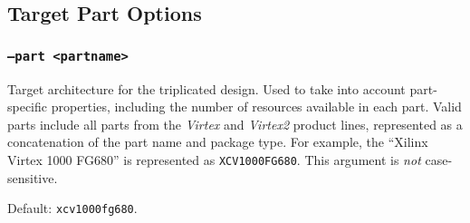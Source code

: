 \subsection{Target Part Options}

\subsubsection{\texttt{--part <partname>}}
Target architecture for the triplicated design. Used to take into account 
part-specific properties, including the number of resources available 
in each part. Valid parts include all parts from the \emph{Virtex} and 
\emph{Virtex2} product lines, represented as a concatenation of the part name 
and package type. For example, the ``Xilinx Virtex 1000 FG680'' is represented 
as \texttt{XCV1000FG680}. This argument is \emph{not} case-sensitive.

Default: \texttt{xcv1000fg680}.
